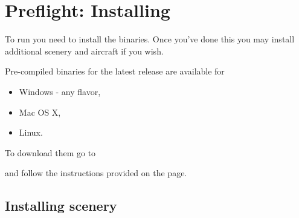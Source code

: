 
\chapter{Preflight: Installing \FlightGear{} \label{prefligh}}

To run \FlightGear{} you need to install the binaries. Once you've done this you may install additional scenery and aircraft if you wish.

Pre-compiled binaries for the latest release are available for

\begin{itemize}
\item Windows - any flavor,
\item Mac OS X,
\item Linux.
\end{itemize}

To download them go to

\medskip
{}
\medskip

and follow the instructions provided on the page.

\section{Installing scenery}

